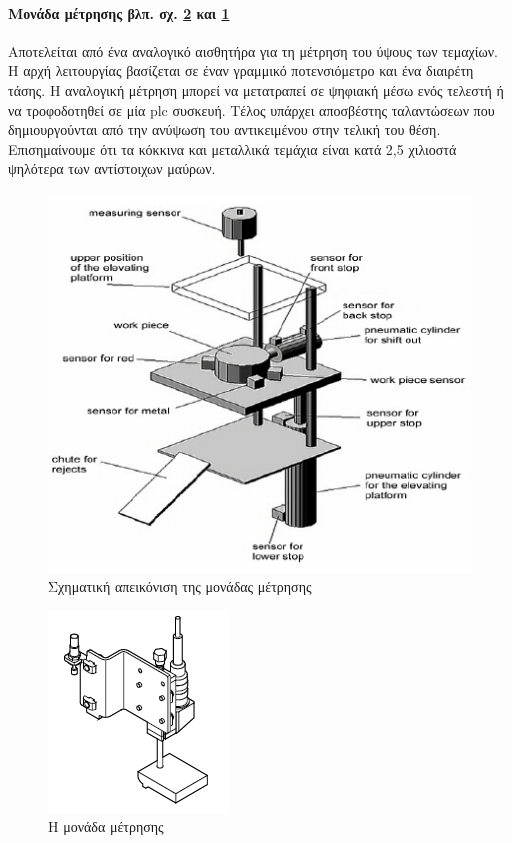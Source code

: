 \documentclass[a4paper,12pt,twoside]{report}
\begin{document}
				\paragraph{Μονάδα μέτρησης {\footnotesize βλπ. σχ. \ref{φωτ:Η μονάδα μέτρησης από Festo} και \ref{φωτ:Σχηματική απεικόνιση της μονάδας μέτρησης από Θράμπο}}} {Αποτελείται από ένα αναλογικό αισθητήρα για τη μέτρηση του ύψους των τεμαχίων. Η αρχή λειτουργίας βασίζεται σε έναν γραμμικό ποτενσιόμετρο και ένα διαιρέτη τάσης. Η αναλογική μέτρηση μπορεί να μετατραπεί σε ψηφιακή μέσω ενός τελεστή ή να τροφοδοτηθεί σε μία plc συσκευή. Τέλος υπάρχει αποσβέστης ταλαντώσεων που δημιουργούνται από την ανύψωση του αντικειμένου στην τελική του θέση.\\Επισημαίνουμε ότι τα κόκκινα και μεταλλικά τεμάχια είναι κατά 2,5 χιλιοστά ψηλότερα των αντίστοιχων μαύρων.
				}
				\begin{figure}[hp]
					\centering
					\includegraphics[scale=1]{TestingStationPartsThrambo.png}
					\caption{Σχηματική απεικόνιση της μονάδας μέτρησης \cite{ΤοΦυσικόΣύστημαFestoMPS}}
					\label{φωτ:Σχηματική απεικόνιση της μονάδας μέτρησης από Θράμπο}
				\end{figure}	
				
				\begin{figure}[hp]
					\centering
					\includegraphics[scale=1]{TestingStationMeasuringModule.png}
					\caption{Η μονάδα μέτρησης \cite{FestoMPSTestingStationManual}}
					\label{φωτ:Η μονάδα μέτρησης από Festo}
				\end{figure}			
				
\end{document}
